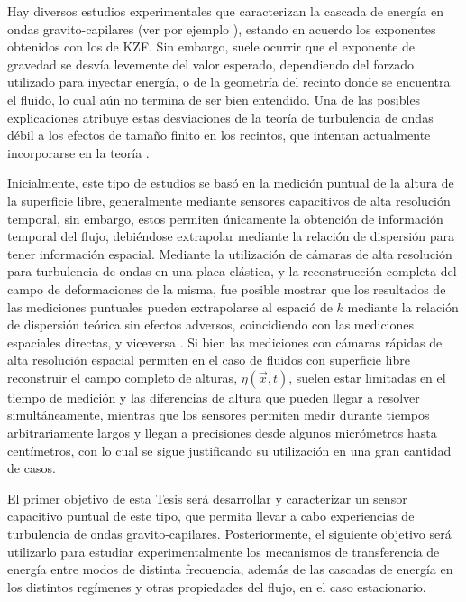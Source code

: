Hay diversos estudios experimentales que caracterizan la cascada de energía en ondas gravito-capilares (ver por ejemplo \cite{falconObservationGravityCapillaryWave2007}), estando en acuerdo los exponentes obtenidos con los de KZF. Sin embargo, suele ocurrir que el exponente de gravedad se desvía levemente del valor esperado, dependiendo del forzado utilizado para inyectar energía, o de la geometría del recinto donde se encuentra el fluido, lo cual aún no termina de ser bien entendido. Una de las posibles explicaciones atribuye estas desviaciones de la teoría de turbulencia de ondas débil a los efectos de tamaño finito en los recintos, que intentan actualmente incorporarse en la teoría \cite{kartashovaTheoryDiscreteMesoscopic, lvovDiscretenessItsEffect2006}.  

Inicialmente, este tipo de estudios se basó en la medición puntual de la altura de la superficie libre, generalmente mediante sensores capacitivos de alta resolución temporal, sin embargo, estos permiten únicamente la obtención de información temporal del flujo, debiéndose extrapolar mediante la relación de dispersión para tener información espacial. Mediante la utilización de cámaras de alta resolución para turbulencia de ondas en una placa elástica, y la reconstrucción completa del campo de deformaciones de la misma, fue posible mostrar que los resultados de las mediciones puntuales pueden extrapolarse al espació de $k$ mediante la relación de dispersión teórica sin efectos adversos, coincidiendo con las mediciones espaciales directas, y viceversa \cite{cobelliSpaceTimeResolvedWave2009}. Si bien las mediciones con cámaras rápidas de alta resolución espacial permiten en el caso de fluidos con superficie libre reconstruir el campo completo de alturas, $\eta(\vec x, t)$, suelen estar limitadas en el tiempo de medición y las diferencias de altura que pueden llegar a resolver simultáneamente, mientras que los sensores permiten medir durante tiempos arbitrariamente largos y llegan a precisiones desde algunos micrómetros hasta centímetros, con lo cual se sigue justificando su utilización en una gran cantidad de casos.  
 
El primer objetivo de esta Tesis será desarrollar y caracterizar un sensor capacitivo puntual de este tipo, que permita llevar a cabo experiencias de turbulencia de ondas gravito-capilares. Posteriormente, el siguiente objetivo será utilizarlo para estudiar experimentalmente los mecanismos de transferencia de energía entre modos de distinta frecuencia, además de las cascadas de energía en los distintos regímenes y otras propiedades del flujo, en el caso estacionario. 

